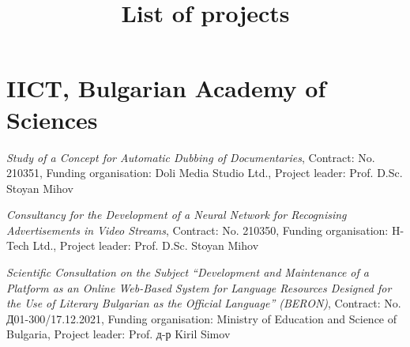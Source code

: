 \documentclass[a4paper,12pt]{article}
\title{\textbf{List of projects}}
\date{}
\author{}
\begin{document}
	\maketitle
	\section*{IICT, Bulgarian Academy of Sciences}
	\begin{description}[leftmargin=!,labelwidth=\widthof{\textbf{2021--2023}},align=right]
		\item[\textbf{2023}] \emph{Study of a Concept for Automatic Dubbing of Documentaries}, Contract: No. 210351, Funding organisation: Doli Media Studio Ltd., Project leader: Prof. D.Sc. Stoyan Mihov
		\item[\textbf{2023}] \emph{Consultancy for the Development of a Neural Network for Recognising Advertisements in Video Streams}, Contract: No. 210350, Funding organisation: H-Tech Ltd., Project leader: Prof. D.Sc. Stoyan Mihov
		\item[\textbf{2021--2023}] \emph{Scientific Consultation on the Subject ``Development and Maintenance of a Platform as an Online Web-Based System for Language Resources Designed for the Use of Literary Bulgarian as the Official Language'' (BERON)}, Contract: No. Д01-300/17.12.2021, Funding organisation: Ministry of Education and Science of Bulgaria, Project leader: Prof. д-р Kiril Simov

\end{description}
\end{document}
